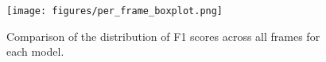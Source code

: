 \begin{figure}
  \centering
  \texttt{[image: figures/per\_frame\_boxplot.png]}
  
  \caption{\label{fig:frame-boxplot} Comparison of the distribution of F1 scores across all frames for each model.}
\end{figure}